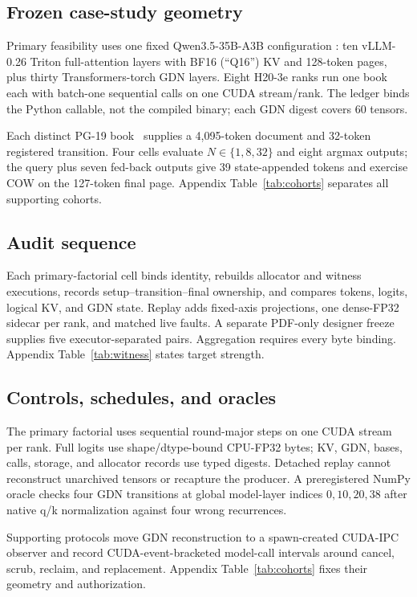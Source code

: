\documentclass{article}
\begin{document}
\subsection{Frozen case-study geometry}

Primary feasibility uses one fixed Qwen3.5-35B-A3B configuration
\citep{qwen2026qwen35,qwen2026qwen35modelcard}: ten vLLM-0.26 Triton
full-attention layers with BF16 (``Q16'') KV and 128-token pages, plus thirty
Transformers-torch GDN layers.  Eight H20-3e ranks run one book each with
batch-one sequential calls on one CUDA stream/rank.  The ledger binds the
Python callable, not the compiled binary; each GDN digest covers 60 tensors.

Each distinct PG-19 book~\citep{rae2020compressive} supplies a 4,095-token
document and 32-token registered transition.  Four cells evaluate
$N\in\{1,8,32\}$ and eight argmax outputs; the query plus seven fed-back outputs
give 39 state-appended tokens and exercise COW on the 127-token final page.
Appendix Table~\ref{tab:cohorts} separates all supporting cohorts.

\subsection{Audit sequence}

Each primary-factorial cell binds identity, rebuilds allocator and witness
executions, records setup--transition--final ownership, and compares tokens,
logits, logical KV, and GDN state.  Replay adds fixed-axis projections, one
dense-FP32 sidecar per rank, and matched live faults.  A separate PDF-only
designer freeze supplies five executor-separated pairs.  Aggregation requires
every byte binding.  Appendix Table~\ref{tab:witness} states target strength.

\subsection{Controls, schedules, and oracles}

The primary factorial uses sequential round-major steps on one CUDA stream per
rank.  Full logits use shape/dtype-bound CPU-FP32 bytes; KV, GDN, bases, calls,
storage, and allocator records use typed digests.  Detached replay cannot
reconstruct unarchived tensors or recapture the producer.  A preregistered
NumPy oracle checks four GDN transitions at global model-layer indices
$0,10,20,38$ after native q/k normalization against four wrong recurrences.

Supporting protocols move GDN reconstruction to a spawn-created CUDA-IPC
observer and record CUDA-event-bracketed model-call intervals around cancel,
scrub, reclaim, and replacement.  Appendix Table~\ref{tab:cohorts} fixes their
geometry and authorization.
\end{document}
